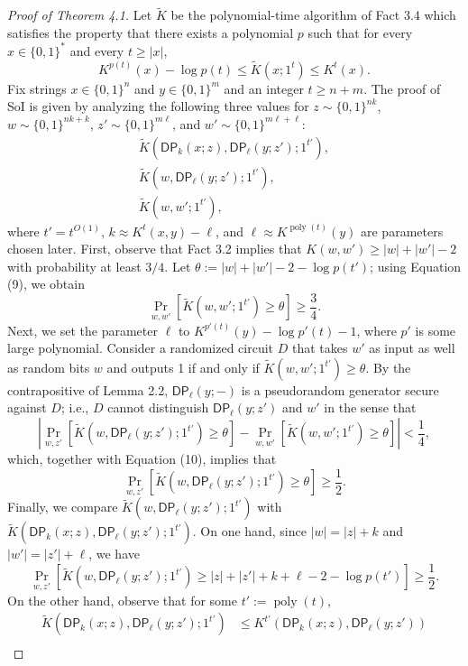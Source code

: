 \documentclass[10pt,a4paper]{article}
\begin{document}
\begin{proof}[Proof of Theorem 4.1]
Let $\widetilde K$ be the polynomial-time algorithm of Fact 3.4 which satisfies the property that there exists a polynomial $p$ such that for every $x\in\{0,1\}^*$ and every $t\geq|x|$,
\[K^{p(t)}(x)-\log p(t)\leq\widetilde K(x;1^t)\leq K^t(x).\tag{9}\]
Fix strings $x\in\{0,1\}^n$ and $y\in\{0,1\}^m$ and an integer $t\geq n+m$. The proof of SoI is given by analyzing the following three values for $z\sim\{0,1\}^{nk}$, $w\sim\{0,1\}^{nk+k}$, $z'\sim\{0,1\}^{m\ell}$, and $w'\sim\{0,1\}^{m\ell+\ell}$:
\[\begin{gathered}
\widetilde K(\mathsf{DP}_k(x;z),\mathsf{DP}_\ell(y;z');1^{t'}),\\
\widetilde K(w,\mathsf{DP}_\ell(y;z');1^{t'}),\\
\widetilde K(w,w';1^{t'}),
\end{gathered}\]
where $t'=t^{O(1)}$, $k\approx K^t(x,y)-\ell$, and $\ell\approx K^{\operatorname{poly}(t)}(y)$ are parameters chosen later.
First, observe that Fact 3.2 implies that $K(w,w')\geq|w|+|w'|-2$ with probability at least $3/4$. Let $\theta:=|w|+|w'|-2-\log p(t')$; using Equation (9), we obtain
\[\Pr_{w,w'}[\widetilde K(w,w';1^{t'})\geq\theta]\geq\frac34.\tag{10}\]
Next, we set the parameter $\ell$ to $K^{p'(t)}(y)-\log p'(t)-1$, where $p'$ is some large polynomial. Consider a randomized circuit $D$ that takes $w'$ as input as well as random bits $w$ and outputs 1 if and only if $\widetilde K(w,w';1^{t'})\geq\theta$. By the contrapositive of Lemma 2.2, $\mathsf{DP}_\ell(y;-)$ is a pseudorandom generator secure against $D$; i.e., $D$ cannot distinguish $\mathsf{DP}_\ell(y;z')$ and $w'$ in the sense that
\[\left|\Pr_{w,z'}[\widetilde K(w,\mathsf{DP}_\ell(y;z');1^{t'})\geq\theta]-\Pr_{w,w'}[\widetilde K(w,w';1^{t'})\geq\theta]\right|<\frac14,\]
which, together with Equation (10), implies that
\[\Pr_{w,z'}[\widetilde K(w,\mathsf{DP}_\ell(y;z');1^{t'})\geq\theta]\geq\frac12.\]
Finally, we compare $\widetilde K(w,\mathsf{DP}_\ell(y;z');1^{t'})$ with $\widetilde K(\mathsf{DP}_k(x;z),\mathsf{DP}_\ell(y;z');1^{t'})$. On one hand, since $|w|=|z|+k$ and $|w'|=|z'|+\ell$, we have
\[\Pr_{w,z'}[\widetilde K(w,\mathsf{DP}_\ell(y;z');1^{t'})\geq|z|+|z'|+k+\ell-2-\log p(t')]\geq\frac12.\tag{11}\]
On the other hand, observe that for some $t':=\operatorname{poly}(t)$,
\begin{align*}
\widetilde K(\mathsf{DP}_k(x;z),\mathsf{DP}_\ell(y;z');1^{t'})
&\leq K^{t'}(\mathsf{DP}_k(x;z),\mathsf{DP}_\ell(y;z'))\\

\end{align*}
\end{proof}
\end{document}

